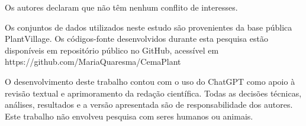 \documentclass[portuguese]{sbc2025}%
\begin{document}
\begin{declarations}

\begin{interests}
Os autores declaram que não têm nenhum conflito de interesses.
\end{interests}

\begin{materials}
Os conjuntos de dados utilizados neste estudo são provenientes da base pública PlantVillage. Os códigos-fonte desenvolvidos durante 
esta pesquisa estão disponíveis em repositório público no GitHub, acessível em https://github.com/MariaQuaresma/CemaPlant
\end{materials}

\begin{furtherinformation}
O desenvolvimento deste trabalho contou com o uso do ChatGPT como apoio à revisão textual e aprimoramento da 
redação científica. Todas as decisões técnicas, análises, resultados e a versão apresentada são de responsabilidade
dos autores. Este trabalho não envolveu pesquisa com seres humanos ou animais.
\end{furtherinformation}
\end{declarations}





\end{document}

